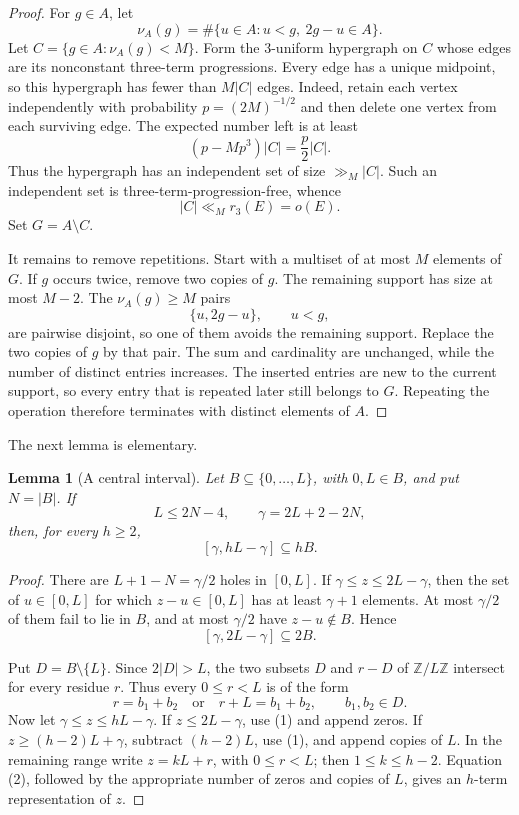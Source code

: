 \documentclass[10pt,reqno]{amsart}
\newtheorem{lemma}[theorem]{Lemma}
\theoremstyle{remark}
\newcommand{\card}[1]{\lvert #1\rvert}
\begin{document}
\begin{proof}
For $g\in A$, let
\[
 \nu_A(g)=\#\{u\in A:u<g,\ 2g-u\in A\}.
\]
Let $C=\{g\in A:\nu_A(g)<M\}$.  Form the $3$-uniform hypergraph on $C$ whose edges are its nonconstant three-term progressions.  Every edge has a unique midpoint, so this hypergraph has fewer than $M\card C$ edges.  Indeed, retain each vertex independently with probability $p=(2M)^{-1/2}$ and then delete one vertex from each surviving edge.  The expected number left is at least
\[
 (p-Mp^3)\card C=\frac p2\card C.
\]
Thus the hypergraph has an independent set of size $\gg_M\card C$.  Such an independent set is three-term-progression-free, whence
\[
 \card C\ll_M r_3(E)=o(E).
\]
Set $G=A\setminus C$.

It remains to remove repetitions.  Start with a multiset of at most $M$ elements of $G$.  If $g$ occurs twice, remove two copies of $g$.  The remaining support has size at most $M-2$.  The $\nu_A(g)\geq M$ pairs
\[
 \{u,2g-u\},\qquad u<g,
\]
are pairwise disjoint, so one of them avoids the remaining support.  Replace the two copies of $g$ by that pair.  The sum and cardinality are unchanged, while the number of distinct entries increases.  The inserted entries are new to the current support, so every entry that is repeated later still belongs to $G$.  Repeating the operation therefore terminates with distinct elements of $A$.
\end{proof}

The next lemma is elementary.

\begin{lemma}[A central interval]\label{lem:central}
Let $B\subseteq\{0,\ldots,L\}$, with $0,L\in B$, and put $N=\card B$.
If
\[
 L\leq2N-4,
 \qquad
 \gamma=2L+2-2N,
\]
then, for every $h\geq2$,
\[
 [\gamma,hL-\gamma]\subseteq hB.
\]
\end{lemma}

\begin{proof}
There are $L+1-N=\gamma/2$ holes in $[0,L]$.  If
$\gamma\leq z\leq2L-\gamma$, then the set of $u\in[0,L]$ for which $z-u\in[0,L]$ has at least $\gamma+1$ elements.  At most $\gamma/2$ of them fail to lie in $B$, and at most $\gamma/2$ have $z-u\notin B$.  Hence
\[
 [\gamma,2L-\gamma]\subseteq2B. \tag{1}
\]

Put $D=B\setminus\{L\}$.  Since $2\card D>L$, the two subsets $D$ and $r-D$ of $\mathbb Z/L\mathbb Z$ intersect for every residue $r$.  Thus every $0\leq r<L$ is of the form
\[
 r=b_1+b_2
 \quad\text{or}\quad
 r+L=b_1+b_2,
 \qquad b_1,b_2\in D. \tag{2}
\]
Now let $\gamma\leq z\leq hL-\gamma$.  If $z\leq2L-\gamma$, use (1) and append zeros.  If $z\geq(h-2)L+\gamma$, subtract $(h-2)L$, use (1), and append copies of $L$.  In the remaining range write $z=kL+r$, with $0\leq r<L$; then $1\leq k\leq h-2$.  Equation (2), followed by the appropriate number of zeros and copies of $L$, gives an $h$-term representation of $z$.
\end{proof}
\end{document}
